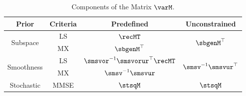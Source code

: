 \begin{table}[t]
    \captionsetup{font=small}
    \caption{\small{Components of the Matrix $\varM$.}}
    \vspace{-5mm}
    \label{table:P}
    \renewcommand{\arraystretch}{1.4}
    \small
    \begin{tabular}[t]{c|c||c|c}
        \toprule
            Prior & Criteria & Predefined & Unconstrained\\
            \hline
            \multirow{2}{*}{Subspace} & LS & $\recMT$ & \multirow{2}{*}{$\sbgenM^{\top}$} \\
            & MX & $\sbgenM^{\top}$ & \\
            \hline
            \multirow{2}{*}{Smoothness} & LS & $\smsvor^{-1} \smsvorur^{\top} \recMT$ & \multirow{2}{*}{$\smsv^{-1} \smsvur^{\top}$}\\
            & MX & $\smsv^{-1} \smsvur$ &  \\
            \hline
            Stochastic & MMSE & $\stsqM$ & $\stsqM$ \\
        \bottomrule
    \end{tabular}
\end{table}